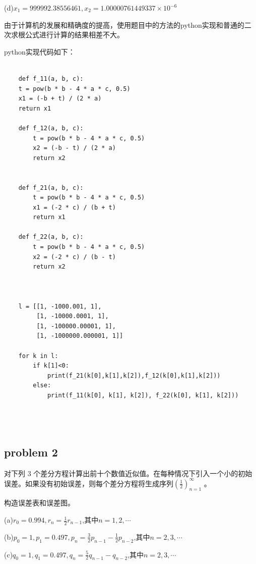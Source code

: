 \documentclass[UTF8]{ctexart}
\begin{document}
(d)$ x_1=999992.38556461 , x_2=1.00000761449337\times 10^{-6}$										

由于计算机的发展和精确度的提高，使用题目中的方法的python实现和普通的二次求根公式进行计算的结果相差不大。

python实现代码如下：
\begin{lstlisting}

	def f_11(a, b, c):
    t = pow(b * b - 4 * a * c, 0.5)
    x1 = (-b + t) / (2 * a)
    return x1

	def f_12(a, b, c):
	    t = pow(b * b - 4 * a * c, 0.5)
	    x2 = (-b - t) / (2 * a)
	    return x2


	def f_21(a, b, c):
	    t = pow(b * b - 4 * a * c, 0.5)
	    x1 = (-2 * c) / (b + t)
	    return x1

	def f_22(a, b, c):
	    t = pow(b * b - 4 * a * c, 0.5)
	    x2 = (-2 * c) / (b - t)
	    return x2



	l = [[1, -1000.001, 1],
	     [1, -10000.0001, 1],
	     [1, -100000.00001, 1],
	     [1, -1000000.000001, 1]]

	for k in l:
	    if k[1]<0:
	        print(f_21(k[0],k[1],k[2]),f_12(k[0],k[1],k[2]))
	    else:
	        print(f_11(k[0], k[1], k[2]), f_22(k[0], k[1], k[2]))
    

	
\end{lstlisting}

\subsection{problem 2}
对下列 3 个差分方程计算出前十个数值近似值。在每种情况下引入一个小的初始误差。如果没有初始误差，则每个差分方程将生成序列${ (\frac{1}{2})_{n=1}^{\infty} }$ 。

构造误差表和误差图。

(a)$r_0=0.994,r_n=\frac{1}{2} r_{n-1}$,其中$n=1,2, \cdots$

(b)$p_0=1,p_1=0.497,p_n=\frac{3}{2} p_{n-1} - \frac{1}{2} p_{n-2}$,其中$n=2,3, \cdots$

(c)$q_0=1,q_1=0.497,q_n=\frac{5}{2} q_{n-1} - q_{n-2}$,其中$n=2,3, \cdots$
\end{document}

